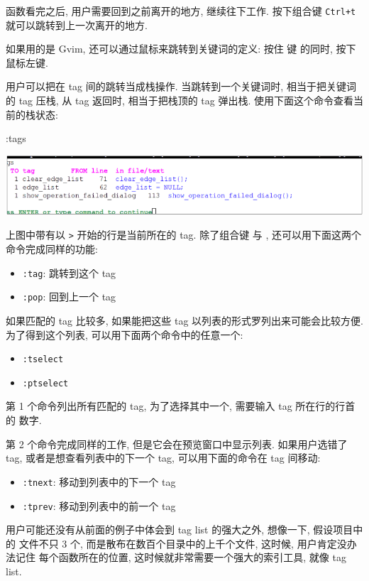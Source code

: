 函数看完之后, 用户需要回到之前离开的地方, 继续往下工作. 按下组合键
\texttt{Ctrl+t} 就可以跳转到上一次离开的地方.

\begin{warning}
    如果用的是 Gvim, 还可以通过鼠标来跳转到关键词的定义: 按住  键
    的同时, 按下鼠标左键.
\end{warning}
用户可以把在 tag 间的跳转当成栈操作. 当跳转到一个关键词时, 相当于把关键词的 tag 
压栈, 从 tag 返回时, 相当于把栈顶的 tag 弹出栈.
使用下面这个命令查看当前的栈状态:
\begin{vimcmd}
:tags
\end{vimcmd}
\begin{center}
    \includegraphics[scale=0.7]{./images/page82.png}
\end{center}
上图中带有以 \texttt{>} 开始的行是当前所在的 tag. 除了组合键 \key{Ctrl+]}
与 , 还可以用下面这两个命令完成同样的功能:
\begin{itemize}
    \item \texttt{:tag}: 跳转到这个 tag
    \item \texttt{:pop}: 回到上一个 tag
\end{itemize}

如果匹配的 tag 比较多, 如果能把这些 tag 以列表的形式罗列出来可能会比较方便.
为了得到这个列表, 可以用下面两个命令中的任意一个:
\begin{itemize}
    \item \texttt{:tselect}
    \item \texttt{:ptselect}
\end{itemize}
第 1 个命令列出所有匹配的 tag, 为了选择其中一个, 需要输入 tag 所在行的行首的
数字.

第 2 个命令完成同样的工作, 但是它会在预览窗口中显示列表. 如果用户选错了 tag,
或者是想查看列表中的下一个 tag, 可以用下面的命令在 tag 间移动:
\begin{itemize}
    \item \texttt{:tnext}: 移动到列表中的下一个 tag
    \item \texttt{:tprev}: 移动到列表中的前一个 tag
\end{itemize}

用户可能还没有从前面的例子中体会到 tag list 的强大之外, 想像一下, 假设项目中的
文件不只 3 个, 而是散布在数百个目录中的上千个文件, 这时候, 用户肯定没办法记住
每个函数所在的位置, 这时候就非常需要一个强大的索引工具, 就像 tag list.

